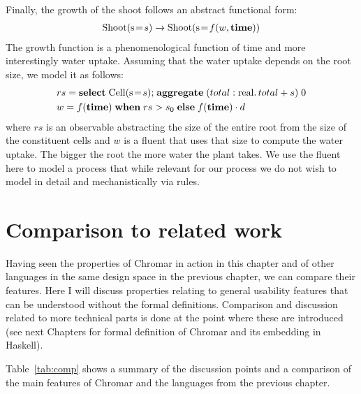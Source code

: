 Finally, the growth of the shoot follows an abstract functional form:
\begin{align*}
\mathrm{Shoot}(\mathrm{s} \! = \! {s}) \xrightarrow{} \mathrm{Shoot}(\mathrm{s} \! = \! {f(w, \mathbf{time})})
\end{align*}
The growth function is a phenomenological function of time and more
interestingly water uptake. Assuming that the water uptake depends on the root
size, we model it as follows:
\begin{align*}
& rs  = \mathbf{select} \; \mathrm{Cell}(\mathrm{s} \! = \! {s}) \mathbf{;} \; \mathbf{aggregate} \;
                                                              (total:
                                                              \mathrm{real}.\,
                                                              total + s) \; 0 \\
& w = f(\mathbf{time}) \; \mathbf{when} \; rs > s_0 \; \mathbf{else} \;
f(\mathbf{time}) \cdot d                                       
\end{align*}
where $rs$ is an observable abstracting the size of the entire root from the
size of the constituent cells and $w$ is a fluent that uses that size to compute
the water uptake. The bigger the root the more water the plant takes. We use the
fluent here to model a process that while relevant for our process we do not
wish to model in detail and mechanistically via rules.

\section{Comparison to related work}
Having seen the properties of Chromar in action in this chapter and of other
languages in the same design space in the previous chapter, we can compare their
features. Here I will discuss properties relating to general usability features
that can be understood without the formal definitions. Comparison and discussion
related to more technical parts is done at the point where these are introduced
(see next Chapters for formal definition of Chromar and its embedding in
Haskell).

Table~\ref{tab:comp} shows a summary of the discussion points and a comparison
of the main features of Chromar and the languages from the previous chapter.

